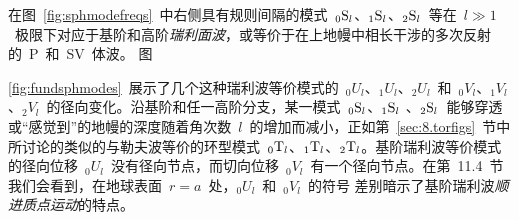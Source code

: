 在图~\ref{fig:sphmodefreqs}~中右侧具有规则间隔的模式~${}_0{\rm S}_l$、${}_1{\rm S}_l$、${}_2{\rm S}_l$~等在~$l\gg 1$~极限下对应于基阶和高阶{\em 瑞利面波\/}，或等价于在上地幔中相长干涉的多次反射的~P~和~SV~体波。
%
%
%
%
%
图~{\ref{fig:fundsphmodes}~展示了几个这种瑞利波等价模式的~${}_0U_l$、${}_1U_l$、${}_2U_l$~和~${}_0V_l$、${}_1V_l$、${}_2V_l$~的径向变化。沿基阶和任一高阶分支，某一模式~${}_0{\rm S}_l$、${}_1{\rm S}_l$ 、${}_2{\rm S}_l$~能够穿透或“感觉到”的地幔的深度随着角次数~$l$~的增加而减小，正如第~\ref{sec:8.torfigs}~节中所讨论的类似的与勒夫波等价的环型模式~${}_0{\rm T}_l$、${}_1{\rm T}_l$、${}_2{\rm T}_l$。基阶瑞利波等价模式的径向位移~${}_0U_l$~没有径向节点，而切向位移~${}_0V_l$~有一个径向节点。在第~11.4~节我们会看到，在地球表面~$r=a$~处，${}_0U_l$~和~${}_0V_l$~的符号
差别暗示了基阶瑞利波{\em 顺进质点运动\/}的特点。
%
%

}

